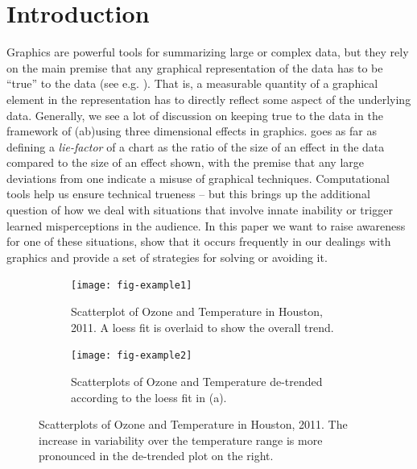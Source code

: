 \documentclass[11pt]{isuthesis}\usepackage[]{graphicx}\usepackage[]{color}
\begin{document}
\section{Introduction}
Graphics are powerful tools for summarizing large or complex data, but they rely on the main premise that any graphical representation of the data has to be ``true'' to the data (see e.g. \citet{tufte, wainer:2000, robbins:2005}). That is, a measurable quantity of a graphical element in the representation has to  directly reflect some aspect of the underlying data. Generally, we see a lot of discussion on keeping true to the data in the framework of (ab)using three dimensional effects in graphics. \cite{tufte} goes as far as defining a {\it lie-factor} of a chart as the ratio of the size of an effect in the data compared to the size of an effect shown, with the premise that any large deviations from one indicate a misuse of graphical techniques. Computational tools help us ensure technical trueness -- but this brings up the additional question of how we deal with situations that involve innate inability or trigger learned misperceptions in the audience. In this paper we want to raise awareness for one of these situations, show that it occurs frequently in our dealings with graphics and provide a set of strategies for solving or avoiding it.



\begin{figure}[h!tbp]\centering
\begin{subfigure}[b]{.45\textwidth}
  \centering
  \texttt{[image: fig-example1]}
  \caption[Scatterplot of Ozone and Temperature in Houston, 2011.]{\small Scatterplot of Ozone and Temperature in Houston, 2011. A loess fit is overlaid to show the overall trend.  \label{fig:example1}}
\end{subfigure}\hfill
\begin{subfigure}[b]{.45\textwidth}
  \centering
  \texttt{[image: fig-example2]}
  \caption[Residual Ozone]{\small Scatterplots of Ozone and Temperature de-trended according to the loess fit in (a). \\ \phantom{text to get to the next line}
  \label{fig:example2}}
\end{subfigure}
\caption[Scatterplots of Ozone and Temperature in Houston, 2011]{\label{fig:exampleFull1} Scatterplots of Ozone and Temperature in Houston, 2011. The increase in variability over the temperature range is more pronounced in the de-trended plot on the right.}
\end{figure}
\end{document}
